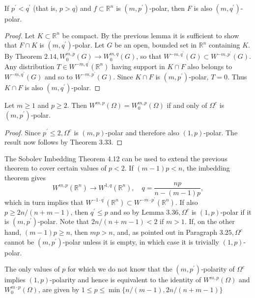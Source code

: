 \begin{lemma}
  If $p^{\prime}<q^{\prime}$ (that is, $p>q$) and $f \subset \mathbb{R}^n$
  is $\left(m, p^{\prime}\right)$-polar, then $F$ is also $\left(m, q^{\prime}\right)$-polar.
\end{lemma}
    
\begin{proof}
  Let $K \subset \mathbb{R}^n$ be compact. By the previous lemma it is sufficient to show that $F \cap K$ is $\left(m, q^{\prime}\right)$-polar. Let $G$ be an open, bounded set in $\mathbb{R}^n$ containing $K$. By Theorem $2.14, W_0^{m, p}(G) \rightarrow W_0^{m, q}(G)$, so that $W^{-m, q^{\prime}}(G) \subset W^{-m, p^{\prime}}(G)$. Any distribution $T \in W^{-m, q^{\prime}}\left(\mathbb{R}^n\right)$ having support in $K \cap F$ also belongs to $W^{-m, q^{\prime}}(G)$ and so to $W^{-m, p^{\prime}}(G)$. Since $K \cap F$ is $\left(m, p^{\prime}\right)$-polar, $T=0$. Thus $K \cap F$ is also $\left(m, q^{\prime}\right)$-polar.
\end{proof}


\begin{theorem}
  Let $m \geq 1$ and $p \geq 2$. Then $W^{m, p}(\Omega)=W_0^{m, p}(\Omega)$ if and only of $\Omega^c$ is $\left(m, p^{\prime}\right)$-polar.
\end{theorem}

\begin{proof}
  Since $p^{\prime} \leq 2, \Omega^c$ is $(m, p)$-polar and therefore also $(1, p)$-polar. The result now follows by Theorem 3.33.
\end{proof}

\begin{para}
  The Sobolev Imbedding Theorem 4.12 can be used to extend the previous theorem to cover certain values of $p<2$. If $(m-1) p<n$, the imbedding theorem gives
  \[
  W^{m, p}\left(\mathbb{R}^n\right) \rightarrow W^{1, q}\left(\mathbb{R}^n\right), \quad q=\frac{n p}{n-(m-1) p},
  \]
  which in turn implies that $W^{-1 \cdot q^{\prime}}\left(\mathbb{R}^n\right) \subset W^{-m \cdot p^{\prime}}\left(\mathbb{R}^n\right)$. If also $p \geq 2 n /(n+m-1)$, then $q^{\prime} \leq p$ and so by Lemma $3.36, \Omega^c$ is $(1, p)$-polar if it is $\left(m, p^{\prime}\right)$-polar. Note that $2 n /(n+m-1)<2$ if $m>1$. If, on the other hand, $(m-1) p \geq n$, then $m p>n$, and, as pointed out in Paragraph $3.25, \Omega^c$ cannot be $\left(m, p^{\prime}\right)$-polar unless it is empty, in which case it is trivially $(1, p)$-polar.
  
  The only values of $p$ for which we do not know that the $\left(m, p^{\prime}\right)$-polarity of $\Omega^c$ implies $(1, p)$-polarity and hence is equivalent to the identity of $W^{m, p}(\Omega)$ and $W_0^{m \cdot p}(\Omega)$, are given by $1 \leq p \leq \min \{n /(m-1), 2 n /(n+m-1)\}$
\end{para}

